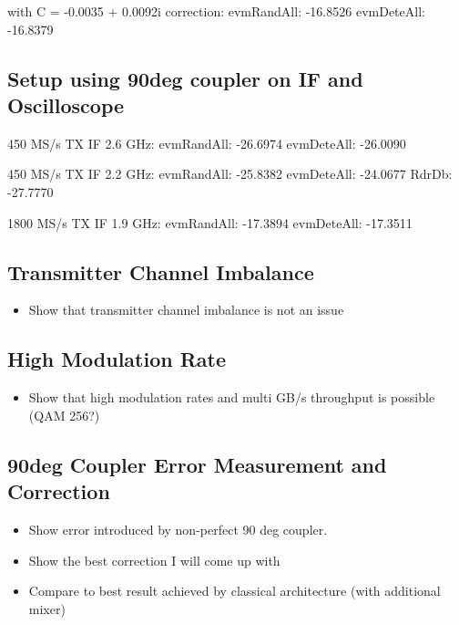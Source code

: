 with C = -0.0035 + 0.0092i correction:
evmRandAll: -16.8526
evmDeteAll: -16.8379

\subsection{Setup using 90deg coupler on IF and Oscilloscope}



450 MS/s TX IF 2.6 GHz:
evmRandAll: -26.6974
evmDeteAll: -26.0090

450 MS/s TX IF 2.2 GHz:
evmRandAll: -25.8382
evmDeteAll: -24.0677
RdrDb: -27.7770

1800 MS/s TX IF 1.9 GHz:
evmRandAll: -17.3894
evmDeteAll: -17.3511




\subsection{Transmitter Channel Imbalance}
\begin{itemize}
\item Show that transmitter channel imbalance is not an issue
\end{itemize}

\subsection{High Modulation Rate}
\begin{itemize}
\item Show that high modulation rates and multi GB/s throughput is possible (\gls{QAM} 256?)
\end{itemize}

\subsection{90deg Coupler Error Measurement and Correction}
\begin{itemize}
\item Show error introduced by non-perfect 90 deg coupler.
\item Show the best correction I will come up with
\item Compare to best result achieved by classical architecture (with additional mixer)
\end{itemize}

